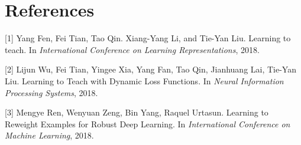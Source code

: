\documentclass{article}
\begin{document}
\section*{References}
\medskip
\small
[1] Yang Fen, Fei Tian, Tao Qin. Xiang-Yang Li, and Tie-Yan Liu. Learning to teach. 
In \textit{International Conference on Learning Representations}, 2018. 

[2] Lijun Wu, Fei Tian, Yingee Xia, Yang Fan, Tao Qin, Jianhuang Lai, Tie-Yan Liu.
Learning to Teach with Dynamic Loss Functions. In \textit{Neural Information Processing Systems}, 2018. 

[3] Mengye Ren, Wenyuan Zeng, Bin Yang, Raquel Urtasun. Learning to Reweight Examples
for Robust Deep Learning. In \textit{International Conference on Machine Learning}, 2018.
\end{document}

